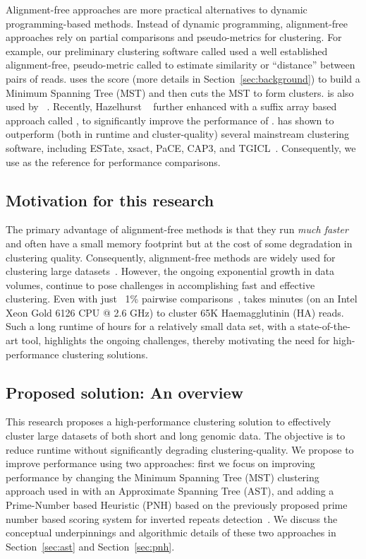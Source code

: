 Alignment-free approaches are more practical alternatives to dynamic
programming-based methods.  Instead of dynamic programming,
alignment-free approaches rely on partial comparisons and
pseudo-metrics for clustering.  For example, our preliminary
clustering software called \peace\/ used a well established
alignment-free, pseudo-metric called  to estimate similarity or
``distance'' between pairs of reads.  \peace\/ uses the  score
(more details in Section~\ref{sec:background}) to build a Minimum
Spanning Tree (MST) and then cuts the MST to form clusters.   is
also used by ~\cite{hazelhurst-08}.  Recently, Hazelhurst
\etal~\cite{hazelhurst-11} further enhanced  with a suffix
array based approach called , to significantly improve the
performance of .   has shown to outperform (both
in runtime and cluster-quality) several mainstream clustering
software, including ESTate, xsact, PaCE, CAP3, and
TGICL~\cite{hazelhurst-11}.  Consequently, we use  as
the reference for performance comparisons.

\subsection{Motivation for this research}

The primary advantage of alignment-free methods is that they run
\emph{much faster} and often have a small memory footprint but at the
cost of some degradation in clustering quality.  Consequently,
alignment-free methods are widely used for clustering large
datasets~\cite{zielezinski-17,vinga-14}.  However, the ongoing
exponential growth in data volumes, continue to pose challenges in
accomplishing fast and effective clustering.  Even with just ~1\%
pairwise comparisons~\cite{hazelhurst-11},  takes
 minutes (on an Intel
Xeon\textsuperscript{\textregistered}\/ Gold 6126 CPU @ 2.6 GHz) to
cluster \mytilde65K Haemagglutinin (HA) reads.  Such a long runtime of
 hours for a relatively small data set, with a
state-of-the-art tool, highlights the ongoing challenges, thereby
motivating the need for high-performance clustering solutions.

\subsection{Proposed solution: An overview}

This research proposes a high-performance clustering solution to
effectively cluster large datasets of both short and long genomic
data.  The objective is to reduce runtime without significantly
degrading clustering-quality.  We propose to improve performance using
two approaches:  first we focus on improving performance by
changing the Minimum Spanning Tree (MST) clustering approach used in
\peace\/ with an Approximate Spanning Tree (AST), and 
adding a Prime-Number based Heuristic (PNH) based on the previously
proposed prime number based scoring system for inverted repeats
detection~\cite{sreeskandarajan-14}.  We discuss the conceptual
underpinnings and algorithmic details of these two approaches in
Section~\ref{sec:ast} and Section~\ref{sec:pnh}.

